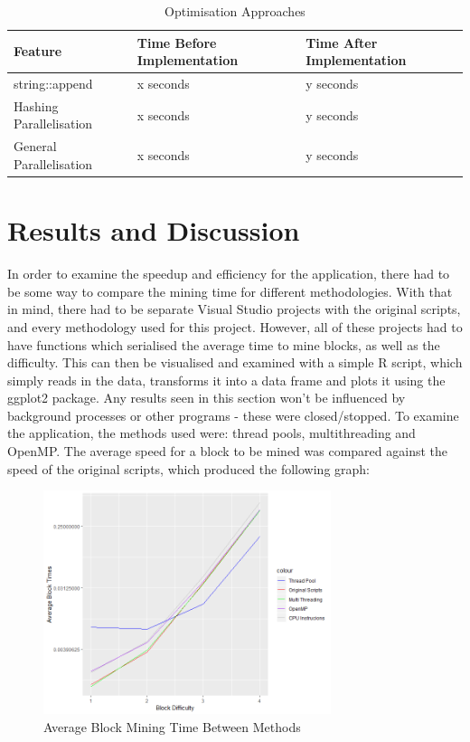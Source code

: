 \documentclass[12pt, a4paper]{article}
\begin{document}
\begin{table}[H]
    \centering
    \begin{tabular}{| l | l | l |}
    \hline
    Feature & Time Before Implementation & Time After Implementation \\ \hline
    string::append & x seconds & y seconds \\ \hline
    Hashing Parallelisation & x seconds & y seconds \\ \hline
    General Parallelisation & x seconds & y seconds \\ \hline
    \end{tabular}
    \caption{Optimisation Approaches}
\end{table}

\section{Results and Discussion}
In order to examine the speedup and efficiency for the application, there had to be some way to compare the mining time for different methodologies. With that in mind, there had to be separate Visual Studio projects with the original scripts, and every methodology used for this project. However, all of these projects had to have functions which serialised the average time to mine blocks, as well as the difficulty. This can then be visualised and examined with a simple R script, which simply reads in the data, transforms it into a data frame and plots it using the ggplot2 package. Any results seen in this section won't be influenced by background processes or other programs - these were closed/stopped. To examine the application, the methods used were: thread pools, multithreading and OpenMP. The average speed for a block to be mined was compared against the speed of the original scripts, which produced the following graph: \\

\begin{figure}[H]
	\centering
		\includegraphics[width=0.75\textwidth]{"Placeholder"}
		\caption{Average Block Mining Time Between Methods}
\end{figure}
\end{document}
